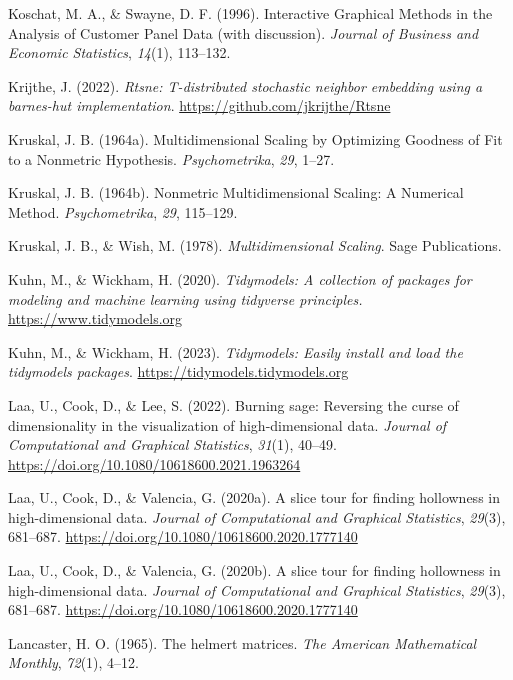 \documentclass[
  letterpaper,
]{krantz}
\newlength{\cslhangindent}
\newenvironment{CSLReferences}[2] %
 {\begin{list}{}{%
  \setlength{\itemindent}{0pt}
  \setlength{\leftmargin}{0pt}
  \setlength{\parsep}{0pt}
  \ifodd #1
   \setlength{\leftmargin}{\cslhangindent}
   \setlength{\itemindent}{-1\cslhangindent}
  \fi
  \setlength{\itemsep}{#2\baselineskip}}}
 {\end{list}}
\begin{document}
\begin{CSLReferences}{1}{0}
Koschat, M. A., \& Swayne, D. F. (1996). Interactive {G}raphical
{M}ethods in the {A}nalysis of {C}ustomer {P}anel {D}ata (with
discussion). \emph{Journal of Business and Economic Statistics},
\emph{14}(1), 113--132.

Krijthe, J. (2022). \emph{Rtsne: T-distributed stochastic neighbor
embedding using a barnes-hut implementation}.
\url{https://github.com/jkrijthe/Rtsne}

Kruskal, J. B. (1964a). Multidimensional {S}caling by {O}ptimizing
{G}oodness of {F}it to a {N}onmetric {H}ypothesis. \emph{Psychometrika},
\emph{29}, 1--27.

Kruskal, J. B. (1964b). Nonmetric {M}ultidimensional {S}caling: A
{N}umerical {M}ethod. \emph{Psychometrika}, \emph{29}, 115--129.

Kruskal, J. B., \& Wish, M. (1978). \emph{Multidimensional {S}caling}.
Sage Publications.

Kuhn, M., \& Wickham, H. (2020). \emph{Tidymodels: A collection of
packages for modeling and machine learning using tidyverse principles.}
\url{https://www.tidymodels.org}

Kuhn, M., \& Wickham, H. (2023). \emph{Tidymodels: Easily install and
load the tidymodels packages}. \url{https://tidymodels.tidymodels.org}

Laa, U., Cook, D., \& Lee, S. (2022). Burning sage: Reversing the curse
of dimensionality in the visualization of high-dimensional data.
\emph{Journal of Computational and Graphical Statistics}, \emph{31}(1),
40--49. \url{https://doi.org/10.1080/10618600.2021.1963264}

Laa, U., Cook, D., \& Valencia, G. (2020a). A slice tour for finding
hollowness in high-dimensional data. \emph{Journal of Computational and
Graphical Statistics}, \emph{29}(3), 681--687.
\url{https://doi.org/10.1080/10618600.2020.1777140}

Laa, U., Cook, D., \& Valencia, G. (2020b). A slice tour for finding
hollowness in high-dimensional data. \emph{Journal of Computational and
Graphical Statistics}, \emph{29}(3), 681--687.
\url{https://doi.org/10.1080/10618600.2020.1777140}

Lancaster, H. O. (1965). The helmert matrices. \emph{The American
Mathematical Monthly}, \emph{72}(1), 4--12.


\end{CSLReferences}
\end{document}
